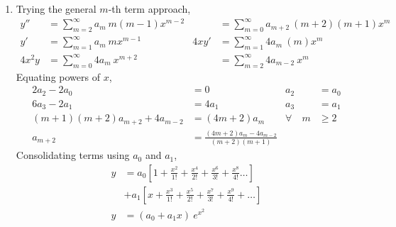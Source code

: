 \begin{enumerate}
    \item Trying the general $ m $-th term approach,
          \begin{align}
              y''     & = \sum_{m=2}^{\infty}a_m\ m(m-1)x^{m-2}     &
                      & = \sum_{m=0}^{\infty}a_{m+2}\ (m+2)(m+1)x^m   \\
              y'      & = \sum_{m=1}^{\infty}a_m\ mx^{m-1}          &
              4xy'    & = \sum_{m=1}^{\infty}4a_{m}\ (m)x^m           \\
              4x^{2}y & = \sum_{m=0}^{\infty}4a_m\ x^{m+2}          &
                      & = \sum_{m = 2}^{\infty}4a_{m-2}\ x^m
          \end{align}
          Equating powers of $ x $,
          \begin{align}
              2a_2 - 2a_0                  & = 0                   &
              a_2                          & = a_0                   \\
              6a_3 - 2a_1                  & = 4a_1                &
              a_3                          & = a_1                   \\
              (m+1)(m+2)a_{m+2} + 4a_{m-2} & = (4m + 2) a_m        &
              \forall \quad m              & \geq 2                  \\
              a_{m+2}                      & = \frac{(4m+2)a_{m} -
                  4a_{m-2}}{(m+2)(m+1)}
          \end{align}
          Consolidating terms using $ a_0 $ and $a_1$,
          \begin{align}
              y & = a_0 \left[ 1 + \frac{x^2}{1!} + \frac{x^4}{2!}
              + \frac{x^6}{3!} + \frac{x^8}{4!}\dots \right]       \\
                & + a_1 \left[ x + \frac{x^3}{1!} + \frac{x^5}{2!}
              + \frac{x^7}{3!} + \frac{x^9}{4!} + \dots \right]    \\
              y & = (a_0 + a_1 x)\ e^{x^2}
          \end{align}


\end{enumerate}
